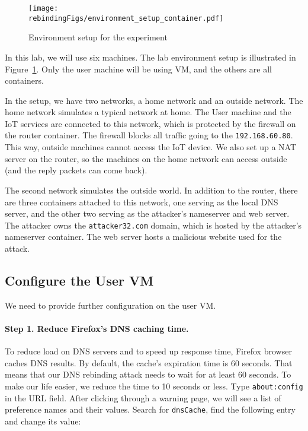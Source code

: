 \begin{figure}[htb]
\centering
\texttt{[image: \\rebindingFigs/environment\_setup\_container.pdf]}
\caption{Environment setup for the experiment}
\label{dns:fig:rebind_environment}
\end{figure}


In this lab, we will use six machines. 
The lab environment setup is illustrated
in Figure~\ref{dns:fig:rebind_environment}. Only the user machine 
will be using VM, and the others are all containers. 

In the setup, we have two networks, a home network and 
an outside network. The home network 
simulates a typical network at home. 
The User machine and the IoT 
services are connected to this network, which
is protected by the firewall on the router container. 
The firewall blocks
all traffic going to the \texttt{192.168.60.80}. 
This way, outside machines cannot 
access the IoT device.
We also set up a NAT server on the router, so the machines
on the home network can access outside (and the reply
packets can come back). 

The second network simulates the outside world. In addition to
the router, there are three containers attached to this network,
one serving as the local DNS server, and the other two
serving as the attacker's nameserver and web server.
The attacker owns the \texttt{attacker32.com} domain, 
which is hosted by the attacker's nameserver container. 
The web server hosts a malicious website used for the 
attack. 








\subsection{Configure the User VM}

We need to provide further configuration on the user VM.


\paragraph{Step 1. Reduce Firefox's DNS caching time.}
To reduce load on DNS servers and to speed up response time, Firefox browser caches DNS
results.  By default, the cache's expiration time is 60 seconds. That means that our DNS
rebinding attack needs to wait for at least 60 seconds. To make our life easier, we reduce
the time to 10 seconds or less. Type \texttt{about:config} in the URL field.
After clicking through a warning page, we will see a list of preference names and their values.
Search for \texttt{dnsCache}, find the following entry and change its value:

